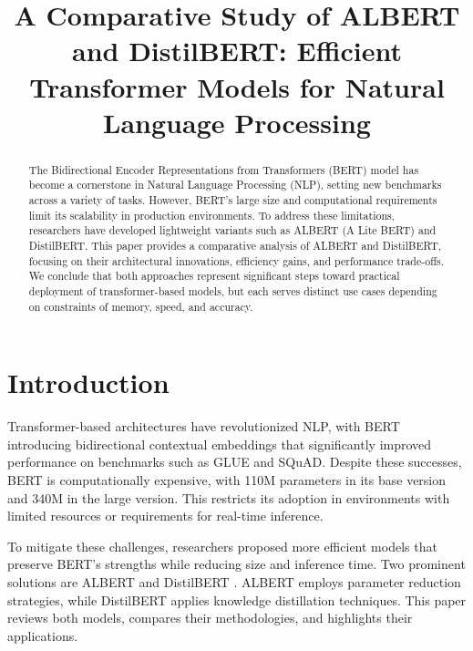 \documentclass{article}
\begin{document}
\title{A Comparative Study of ALBERT and DistilBERT: Efficient Transformer Models for Natural Language Processing}

\author{
}

\maketitle

\begin{abstract}
The Bidirectional Encoder Representations from Transformers (BERT) model has become a cornerstone in Natural Language Processing (NLP), setting new benchmarks across a variety of tasks. However, BERT's large size and computational requirements limit its scalability in production environments. To address these limitations, researchers have developed lightweight variants such as ALBERT (A Lite BERT) and DistilBERT. This paper provides a comparative analysis of ALBERT and DistilBERT, focusing on their architectural innovations, efficiency gains, and performance trade-offs. We conclude that both approaches represent significant steps toward practical deployment of transformer-based models, but each serves distinct use cases depending on constraints of memory, speed, and accuracy.
\end{abstract}

\section{Introduction}
Transformer-based architectures have revolutionized NLP, with BERT \cite{devlin2018bert} introducing bidirectional contextual embeddings that significantly improved performance on benchmarks such as GLUE and SQuAD. Despite these successes, BERT is computationally expensive, with 110M parameters in its base version and 340M in the large version. This restricts its adoption in environments with limited resources or requirements for real-time inference.

To mitigate these challenges, researchers proposed more efficient models that preserve BERT's strengths while reducing size and inference time. Two prominent solutions are ALBERT \cite{lan2019albert} and DistilBERT \cite{sanh2019distilbert}. ALBERT employs parameter reduction strategies, while DistilBERT applies knowledge distillation techniques. This paper reviews both models, compares their methodologies, and highlights their applications.
\end{document}
